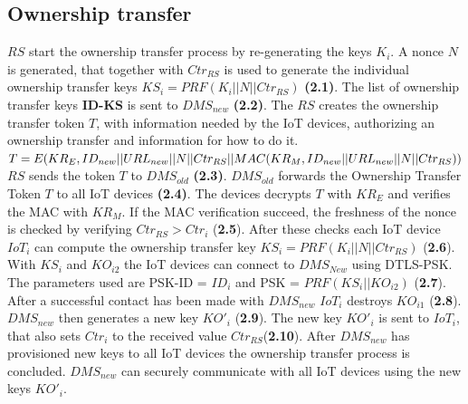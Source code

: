 {\subsection{Ownership transfer}
$RS$ start the ownership transfer process by re-generating the keys $K_i$. A nonce $N$ is generated, that together with $Ctr_{RS}$ is used to generate the individual ownership transfer keys $KS_i = PRF(K_i || N || Ctr_{RS})$ \textbf{(2.1)}. The list of ownership transfer keys \textbf{ID-KS} is sent to $DMS_{new}$ \textbf{(2.2)}. The $RS$ creates the ownership transfer token $T$, with information needed by the IoT devices, authorizing an ownership transfer and information for how to do it. $T = E(KR_E, ID_{new} || URL_{new} || N || Ctr_{RS} || \\ MAC(KR_M, ID_{new} || URL_{new} || N || Ctr_{RS} ))$
$RS$ sends the token $T$ to $DMS_{old}$ \textbf{(2.3)}.
$DMS_{old}$ forwards the Ownership Transfer Token $T$ to all IoT devices \textbf{(2.4)}. The devices decrypts $T$ with $KR_E$ and verifies the MAC with $KR_M$. If the MAC verification succeed, the freshness of the nonce is checked by verifying $Ctr_{RS} > Ctr_i$ (\textbf{2.5}). After these checks each IoT device $IoT_i$ can compute the ownership transfer key $KS_i = PRF(K_i || N || Ctr_{RS})$ (\textbf{2.6}). With $KS_i$ and $KO_{i2}$ the IoT devices can connect to $DMS_{New}$ using DTLS-PSK\cite{rfc7925}. The parameters used are PSK-ID = $ID_i$ and PSK = $PRF(KS_i || KO_{i2})$ (\textbf{2.7}). After a successful contact has been made with $DMS_{new}$ $IoT_i$ destroys $KO_{i1}$ (\textbf{2.8}). $DMS_{new}$ then generates a new key $KO'_i$ (\textbf{2.9}). The new key $KO'_i$ is sent to $IoT_i$, that also sets $Ctr_i$ to the received value $Ctr_{RS}$(\textbf{2.10}). After $DMS_{new}$ has provisioned new keys to all IoT devices the ownership transfer process is concluded. $DMS_{new}$ can securely communicate with all IoT devices using the new keys $KO'_i$.

}

